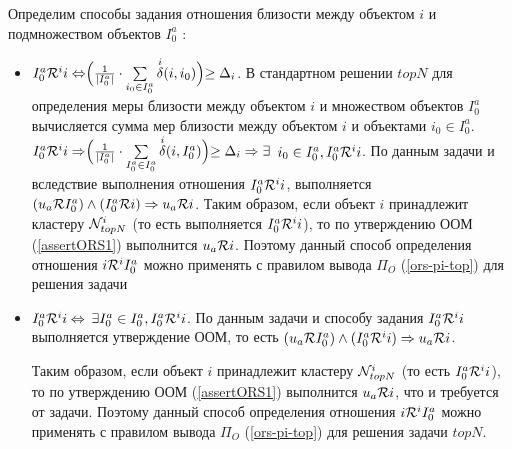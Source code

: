 Определим способы задания отношения близости между объектом $i$ и
подмножеством объектов $I^a_0$
\label{deltaTneighbours}
 \cite{topn1,topn2,amazon-item2item,disser0}:
\begin{itemize}
	\item $I^a_0 \mathcal{R}^i i \Leftrightarrow \Bigr( \frac{1}{|I^a_0|} \cdot \sum \limits_{i_0
		\in I^a_0} {\overset{i}{\mathcal{\delta}}}(i,i_0) \Bigl) \ge \Delta_i$.
		В стандартном решении  \cite{item-based} $topN$
		для определения меры близости между объектом $i$ и множеством объектов
		$I^a_0$ вычисляется сумма мер близости между объектом $i$ и объектами
		$i_0 \in I^a_0$.
		$I^a_0 \mathcal{R}^i i \Rightarrow \Bigr( \frac{1}{|I^a_0|} \cdot \sum \limits_{I^a_0 \in I^a_0}
		{\overset{i}{\mathcal{\delta}}}(i,I^a_0)\Bigl) \ge \Delta_i \Rightarrow \exists$
$i_0 \in I^a_0, I^a_0 \mathcal{R}^i i$.
По данным задачи и вследствие выполнения отношения $I^a_0 \mathcal{R}^i i$, выполняется
		$(u_a \mathcal{R} I^a_0) \wedge (I^a_0 \mathcal{R} i) \Rightarrow u_a \mathcal{R} i$. Таким образом,
если объект $i$ принадлежит кластеру ${\mathcal{N}^i_{topN}}$ (то есть выполняется
		$I^a_0 \mathcal{R}^i i$), то по утверждению ООМ  (\ref{assertORS1}) выполнится $u_a \mathcal{R} i$.
Поэтому данный способ определения отношения $i \mathcal{R}^i I^a_0$ можно
		применять с правилом вывода $\Pi_O$ (\ref{ors-pi-top}) для решения задачи

\item $I^a_0 \mathcal{R}^i i \Leftrightarrow$  $\exists I^a_0 \in I^a_0, I^a_0 \mathcal{R}^i i$.
По данным задачи и способу задания $I^a_0 \mathcal{R}^i i$ выполняется утверждение ООМ, то есть
		$(u_a \mathcal{R} I^a_0) \wedge (I^a_0 \mathcal{R}^i i) \Rightarrow u_a \mathcal{R} i$.

Таким образом, если объект $i$ принадлежит кластеру ${\mathcal{N}^i_{topN}}$ (то есть $I^a_0 \mathcal{R}^i i$),
		то по утверждению ООМ (\ref{assertORS1}) выполнится $u_a \mathcal{R} i$, что и требуется
от задачи.
Поэтому данный способ определения отношения $i \mathcal{R}^i I^a_0$ можно
		применять с правилом вывода $\Pi_O$ (\ref{ors-pi-top}) для решения задачи
$topN$.
\end{itemize}
